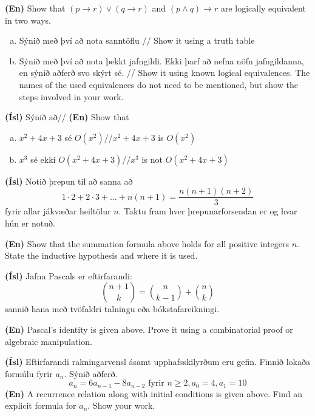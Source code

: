 \documentclass[addpoints]{exam}
\begin{document}
\begin{questions}
\textbf{(En)} Show that $(p \to r) \lor (q \to r)$ and $(p \land q) \to r$ are logically equivalent in two ways.

\begin{enumerate}[a)]
    \item Sýnið með því að nota sanntöflu // Show it using a truth table

    \item Sýnið með því að nota þekkt jafngildi. Ekki þarf að nefna nöfn jafngildanna, en sýnið aðferð svo skýrt sé. // Show it using known logical equivalences. The names of the used equivalences do not need to be mentioned, but show the steps involved in your work.
\end{enumerate}

\newpage
\question[10]

\textbf{(Ísl)} Sýnið að// \textbf{(En)} Show that
\begin{enumerate}[a)]
    \item $x^2 + 4x + 3$ sé $O(x^2)$//$x^2 + 4x + 3$ is $O(x^2)$
    \item $x^3$ sé ekki $O(x^2 + 4x + 3)$//$x^3$ is not $O(x^2 + 4x + 3)$
\end{enumerate}


\newpage

\question[10] 

\textbf{(Ísl)} Notið þrepun til að sanna að \[1\cdot 2 + 2 \cdot 3 + \ldots + n(n+1) = \frac{n(n+1)(n+2)}{3}\] fyrir allar jákvæðar heiltölur $n$. Taktu fram hver þrepunarforsendan er og hvar hún er notuð.

\textbf{(En)} Show that the summation formula above holds for all positive integers $n$. State the inductive hypothesis and where it is used.


\newpage

\question[10] 

\textbf{(Ísl)} Jafna Pascals er eftirfarandi:
\[
    \binom{n+1}{k} = \binom{n}{k-1} + \binom{n}{k}
\]
sannið hana með tvöfaldri talningu eða bókstafareikningi.

\textbf{(En)} Pascal's identity is given above. Prove it using a combinatorial proof or algebraic manipulation.


\newpage
\question[10] 

\textbf{(Ísl)} Eftirfarandi rakningarvensl ásamt upphafsskilyrðum eru gefin. Finnið lokaða formúlu fyrir $a_n$. Sýnið aðferð.
\[
    a_n = 6a_{n-1} - 8a_{n-2} \text{ fyrir } n\geq2, a_0 =4, a_1 = 10
\]
\textbf{(En)} A recurrence relation along with initial conditions is given above. Find an explicit formula for $a_n$. Show your work.


\end{questions}
\end{document}
